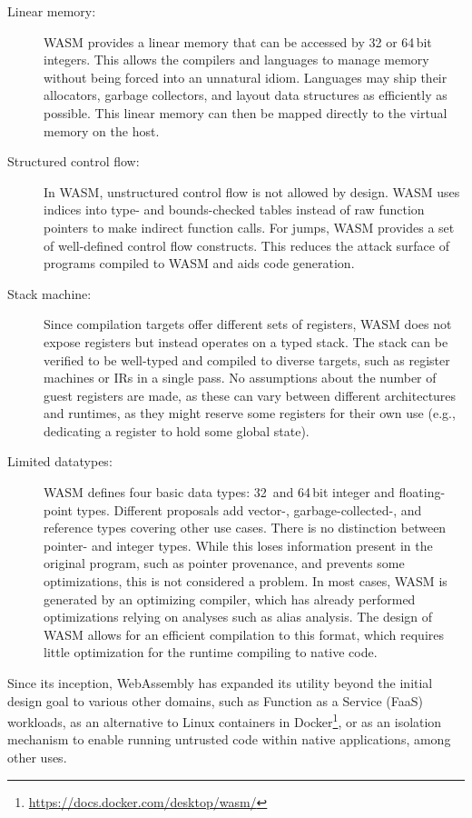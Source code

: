 \begin{description}
    \item[Linear memory:] \Ac{WASM} provides a linear memory that can be accessed by 32 or 64\,bit integers.
    This allows the compilers and languages to manage memory without being forced into an unnatural idiom.
    Languages may ship their allocators, garbage collectors, and layout data structures as efficiently as possible.
    This linear memory can then be mapped directly to the virtual memory on the host.
    \item[Structured control flow:] In \ac{WASM}, unstructured control flow is not allowed by design.
    \ac{WASM} uses indices into type- and bounds-checked tables instead of raw function pointers to make indirect function calls.
    For jumps, \ac{WASM} provides a set of well-defined control flow constructs.
    This reduces the attack surface of programs compiled to \ac{WASM} and aids code generation.
    \item[Stack machine:] Since compilation targets offer different sets of registers, \ac{WASM} does not expose registers but instead operates on a typed stack.
    The stack can be verified to be well-typed and compiled to diverse targets, such as register machines or \acp{IR} in a single pass.
    No assumptions about the number of guest registers are made, as these can vary between different architectures and runtimes, as they might reserve some registers for their own use (e.g., dedicating a register to hold some global state).
    \item[Limited datatypes:] \Ac{WASM} defines four basic data types: 32\, and 64\,bit integer and floating-point types.
    Different proposals add \mbox{vector-}, \mbox{garbage-collected-}, and reference types covering other use cases.
    There is no distinction between pointer- and integer types.
    While this loses information present in the original program, such as pointer provenance, and prevents some optimizations, this is not considered a problem.
    In most cases, \ac{WASM} is generated by an optimizing compiler, which has already performed optimizations relying on analyses such as alias analysis.
    The design of \ac{WASM} allows for an efficient compilation to this format, which requires little optimization for the runtime compiling to native code.
\end{description}

Since its inception, WebAssembly has expanded its utility beyond the initial design goal to various other domains, such as Function as a Service (FaaS) workloads, as an alternative to Linux containers in Docker\footnote{\url{https://docs.docker.com/desktop/wasm/}}, or as an isolation mechanism to enable running untrusted code within native applications, among other uses.


